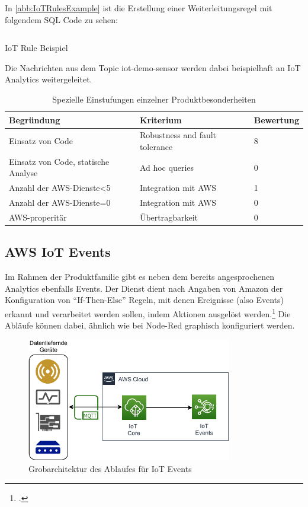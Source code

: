 In \autoref{abb:IoTRulesExample} ist die Erstellung einer Weiterleitungsregel mit folgendem SQL Code zu sehen:
\begin{listing}[H]
\inputminted[frame=lines,breaklines=true]{sql}{code/iot-rules-example.sql}
\caption{IoT Rule Beispiel}
\label{listing:iot-rule-example}
\end{listing}
Die Nachrichten aus dem Topic iot-demo-sensor werden dabei beispielhaft an IoT Analytics weitergeleitet.

\begin{table}[H]
\centering
\begin{tabular}{|l|l|l|}
\hline
\rowcolor[HTML]{ECF4FF} 
Begründung & Kriterium & Bewertung \\ \hline
Einsatz von Code & Robustness and fault tolerance & 8 \\ \hline
Einsatz von Code, statische Analyse & Ad hoc queries & 0 \\ \hline
Anzahl der AWS-Dienste\textless{}5 & Integration mit AWS & 1 \\ \hline
Anzahl der AWS-Dienste=0 & Integration mit AWS & 0 \\ \hline
AWS-properitär & Übertragbarkeit & 0 \\ \hline
\end{tabular}
\caption{Spezielle Einstufungen einzelner Produktbesonderheiten}
\label{tab:einstufungen}
\end{table}



\subsection{AWS IoT Events}




Im Rahmen der \AWSIOT Produktfamilie gibt es neben dem bereits angesprochenen \AWSIOT Analytics ebenfalls \AWSIOT Events.  
Der Dienst dient nach Angaben von Amazon der Konfiguration von \enquote{If-Then-Else} Regeln, mit denen Ereignisse (also Events) erkannt und verarbeitet werden sollen, indem Aktionen ausgelöst werden.\footcite[Vgl.][]{AmazonWebServicesInc..o.J.b} Die Abläufe können dabei, ähnlich wie bei Node-Red graphisch konfiguriert werden. 
\begin{figure}[H]
\centering
\includegraphics[width=0.8\textwidth]{graphics/IoT-Events-general.pdf}
\caption{Grobarchitektur des Ablaufes für IoT Events}
\label{abb:GrobArchitekturIoTEvents}
\end{figure}

